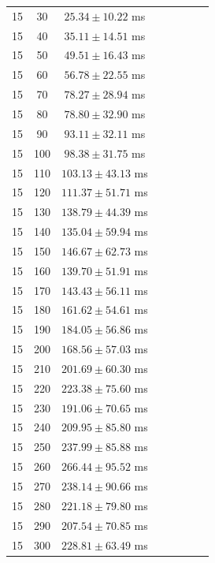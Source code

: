 \begin{table}[htbp]
{\begin{tabular}{|c|c|c||c|c|c|c|c|}
15 & 30 & $25.34 \pm 10.22$ ms &  &  &  &  &  \\
15 & 40 & $35.11 \pm 14.51$ ms &  &  &  &  &  \\
15 & 50 & $49.51 \pm 16.43$ ms &  &  &  &  &  \\
15 & 60 & $56.78 \pm 22.55$ ms &  &  &  &  &  \\
15 & 70 & $78.27 \pm 28.94$ ms &  &  &  &  &  \\
15 & 80 & $78.80 \pm 32.90$ ms &  &  &  &  &  \\
15 & 90 & $93.11 \pm 32.11$ ms &  &  &  &  &  \\
15 & 100 & $98.38 \pm 31.75$ ms &  &  &  &  &  \\
15 & 110 & $103.13 \pm 43.13$ ms &  &  &  &  &  \\
15 & 120 & $111.37 \pm 51.71$ ms &  &  &  &  &  \\
15 & 130 & $138.79 \pm 44.39$ ms &  &  &  &  &  \\
15 & 140 & $135.04 \pm 59.94$ ms &  &  &  &  &  \\
15 & 150 & $146.67 \pm 62.73$ ms &  &  &  &  &  \\
15 & 160 & $139.70 \pm 51.91$ ms &  &  &  &  &  \\
15 & 170 & $143.43 \pm 56.11$ ms &  &  &  &  &  \\
15 & 180 & $161.62 \pm 54.61$ ms &  &  &  &  &  \\
15 & 190 & $184.05 \pm 56.86$ ms &  &  &  &  &  \\
15 & 200 & $168.56 \pm 57.03$ ms &  &  &  &  &  \\
15 & 210 & $201.69 \pm 60.30$ ms &  &  &  &  &  \\
15 & 220 & $223.38 \pm 75.60$ ms &  &  &  &  &  \\
15 & 230 & $191.06 \pm 70.65$ ms &  &  &  &  &  \\
15 & 240 & $209.95 \pm 85.80$ ms &  &  &  &  &  \\
15 & 250 & $237.99 \pm 85.88$ ms &  &  &  &  &  \\
15 & 260 & $266.44 \pm 95.52$ ms &  &  &  &  &  \\
15 & 270 & $238.14 \pm 90.66$ ms &  &  &  &  &  \\
15 & 280 & $221.18 \pm 79.80$ ms &  &  &  &  &  \\
15 & 290 & $207.54 \pm 70.85$ ms &  &  &  &  &  \\
15 & 300 & $228.81 \pm 63.49$ ms &  &  &  &  &  \\
\hline
\end{tabular}%
}
\end{table}